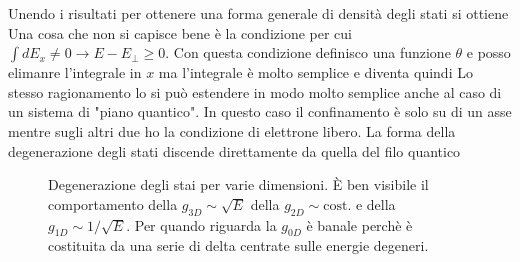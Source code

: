 Unendo i risultati per ottenere una forma generale di densità degli stati si ottiene
Una cosa che non si capisce bene è la condizione per cui $\int dE_x \neq 0 \to E-E_\perp\geq0$. Con questa condizione definisco una funzione $\theta$ e posso elimanre l'integrale in $x$
ma l'integrale è molto semplice e diventa quindi
Lo stesso ragionamento lo si può estendere in modo molto semplice anche al caso di un sistema di "piano quantico". In questo caso il confinamento è solo su di un asse mentre sugli altri due ho la condizione di elettrone libero. La forma della degenerazione degli stati discende direttamente da quella del filo quantico
\begin{figure}
	\centering
	\caption{Degenerazione degli stai per varie dimensioni. \`E ben visibile il comportamento della $g_{3D}\sim\sqrt{E}$ della $g_{2D}\sim\text{cost.}$ e della $g_{1D}\sim1/\sqrt{E}$. Per quando riguarda la $g_{0D}$ è banale perchè è costituita da una serie di delta centrate sulle energie degeneri.}
	\label{DEG:ST}
\end{figure}


